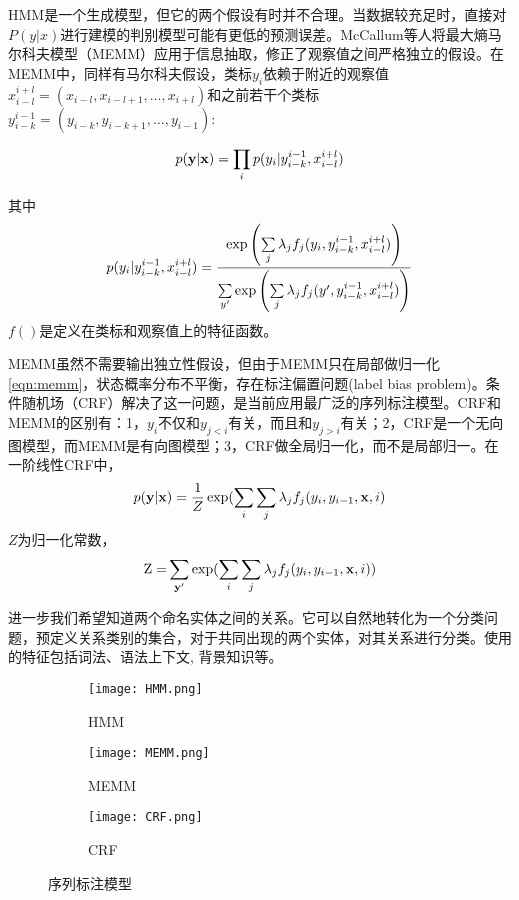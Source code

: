 HMM是一个生成模型，但它的两个假设有时并不合理。当数据较充足时，直接对$P(y|x)$进行建模的判别模型可能有更低的预测误差。McCallum等人将最大熵马尔科夫模型（MEMM）应用于信息抽取\cite{mccallum2000maximum}，修正了观察值之间严格独立的假设。在MEMM中，同样有马尔科夫假设，类标$y_i$依赖于附近的观察值$x_{i - l}^{i + l} = ({x_{i - l}},{x_{i - l + 1}}, \ldots ,{x_{i + l}})$和之前若干个类标$y_{i - k}^{i - 1} = ({y_{i - k}},{y_{i - k + 1}}, \ldots ,{y_{i - 1}})$:

\[p({\bf{y}}|{\bf{x}}) = \prod\limits_i {p({y_i}|y_{i - k}^{i - 1},x_{i - l}^{i + l})} \]

其中
\begin{equation}
{p({y_i}|y_{i - k}^{i - 1},x_{i - l}^{i + l})} = \frac{{\exp \left( {\sum\limits_j {{\lambda _j}{f_j}({y_i}} ,y_{i - k}^{i - 1},x_{i - l}^{i{\rm{ + }}l})} \right)}}{{\sum\limits_{y'} {\exp \left( {\sum\limits_j {{\lambda _j}{f_j}(y'} ,y_{i - k}^{i - 1},x_{i - l}^{i{\rm{ + }}l})} \right)} }} 
\label{eqn:memm}
\end{equation}
$f()$是定义在类标和观察值上的特征函数。

MEMM虽然不需要输出独立性假设，但由于MEMM只在局部做归一化\ref{eqn:memm}，状态概率分布不平衡，存在标注偏置问题(label bias problem)。条件随机场（CRF）\cite{lafferty2001conditional}解决了这一问题，是当前应用最广泛的序列标注模型。CRF和MEMM的区别有：1，$y_i$不仅和$y_{j<i}$有关，而且和$y_{j>i}$有关；2，CRF是一个无向图模型，而MEMM是有向图模型；3，CRF做全局归一化，而不是局部归一。在一阶线性CRF中，
\[ p({\bf{y}}|{\bf{x}}) = \frac{1}{Z}\exp (\sum\limits_i {\sum\limits_j {{\lambda _j}{f_j}({y_i},{y_{i - 1}},{\bf{x}},i)} } \]
$Z$为归一化常数，	
\[{\rm{Z = }}\sum\limits_{{\bf{y'}}} {\exp (\sum\limits_i {\sum\limits_j {{\lambda _j}{f_j}({y_i},{y_{i - 1}},{\bf{x}},i)} } }) \]

进一步我们希望知道两个命名实体之间的关系。它可以自然地转化为一个分类问题，预定义关系类别的集合，对于共同出现的两个实体，对其关系进行分类。使用的特征包括词法、语法上下文\cite{kambhatla2004combining}, 背景知识\cite{guodong2005exploring}\cite{chan2010exploiting}等。

\begin{figure}[h]
\centering
\begin{subfigure}{0.3\textwidth}
\texttt{[image: HMM.png]}
\caption{HMM}
\end{subfigure}

\begin{subfigure}{0.3\textwidth}
\texttt{[image: MEMM.png]}
\caption{MEMM}
\end{subfigure}

\begin{subfigure}{0.3\textwidth}
\texttt{[image: CRF.png]}
\caption{CRF}
\end{subfigure}

\caption{序列标注模型}
\label{fig:seq_label_model}
\end{figure}



